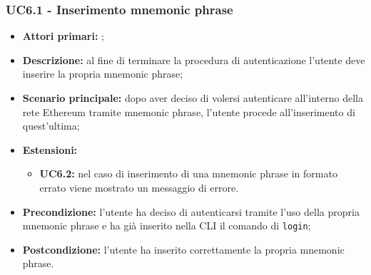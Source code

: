 \subsubsection{UC6.1 - Inserimento mnemonic phrase}
\begin{itemize}
	\item \textbf{Attori primari:} \una{};
	\item \textbf{Descrizione:} al fine di terminare la procedura di autenticazione l’utente deve inserire la propria mnemonic phrase; 
	\item \textbf{Scenario principale:} dopo aver deciso di volersi autenticare all’interno della rete Ethereum tramite mnemonic phrase, l'utente procede all’inserimento di quest’ultima;  
	\item \textbf{Estensioni:} 
	\begin{itemize}
		\item \textbf{UC6.2:} nel caso di inserimento di una mnemonic phrase in formato errato viene mostrato un messaggio di errore. 
	\end{itemize}
	\item \textbf{Precondizione:} l’utente ha deciso di autenticarsi tramite l’uso della propria mnemonic phrase e ha già inserito nella CLI il comando di \texttt{login};
	\item \textbf{Postcondizione:} l’utente ha inserito correttamente la propria mnemonic phrase. 
\end{itemize}